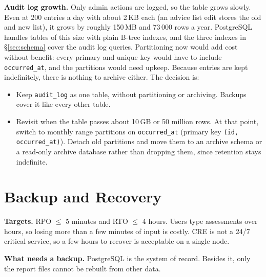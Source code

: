 \documentclass[11pt,a4paper]{article}
\newcommand{\tb}[1]{\texttt{#1}}
\begin{document}
\noindent\textbf{Audit log growth.} Only admin actions are logged, so the table grows slowly. Even at 200 entries a day with about 2\,KB each (an advice list edit stores the old and new list), it grows by roughly 150\,MB and 73\,000 rows a year. PostgreSQL handles tables of this size with plain B-tree indexes, and the three indexes in \S\ref{sec:schema} cover the audit log queries. Partitioning now would add cost without benefit: every primary and unique key would have to include \tb{occurred\_at}, and the partitions would need upkeep. Because entries are kept indefinitely, there is nothing to archive either. The decision is:
\begin{itemize}
\item Keep \tb{audit\_log} as one table, without partitioning or archiving. Backups cover it like every other table.
\item Revisit when the table passes about 10\,GB or 50 million rows. At that point, switch to monthly range partitions on \tb{occurred\_at} (primary key \tb{(id, occurred\_at)}). Detach old partitions and move them to an archive schema or a read-only archive database rather than dropping them, since retention stays indefinite.
\end{itemize}

\needspace{0.5\textheight}\section{Backup and Recovery}\label{sec:backup}

\noindent\textbf{Targets.} RPO $\le$ 5 minutes and RTO $\le$ 4 hours. Users type assessments over hours, so losing more than a few minutes of input is costly. CRE is not a 24/7 critical service, so a few hours to recover is acceptable on a single node.

\noindent\textbf{What needs a backup.} PostgreSQL is the system of record. Besides it, only the report files cannot be rebuilt from other data.
\end{document}
